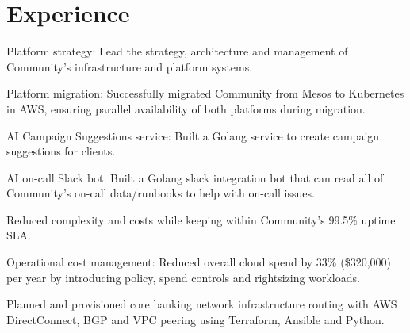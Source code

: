 \documentclass[]{resume}
\begin{document}
%
%

%
%

%
%

\begin{minipage}[t]{0.60\textwidth}

\section{Experience}
\vspace{\topsep} %
\begin{tightemize}
\item Platform strategy: Lead the strategy, architecture and management of Community's infrastructure and platform systems.
\item Platform migration: Successfully migrated Community from Mesos to Kubernetes in AWS, ensuring parallel availability of both platforms during migration.
\item AI Campaign Suggestions service: Built a Golang service to create campaign suggestions for clients.
\item AI on-call Slack bot: Built a Golang slack integration bot that can read all of Community's on-call data/runbooks to help with on-call issues.
\item Reduced complexity and costs while keeping within Community's 99.5\% uptime SLA.
\item Operational cost management: Reduced overall cloud spend by 33\% (\$320,000) per year by introducing policy, spend controls and rightsizing workloads.
\end{tightemize}
\sectionsep

\begin{tightemize}
\item Planned and provisioned core banking network infrastructure routing with AWS DirectConnect, BGP and VPC peering using Terraform, Ansible and Python.
\end{tightemize}
\sectionsep


\end{minipage}
\end{document}
